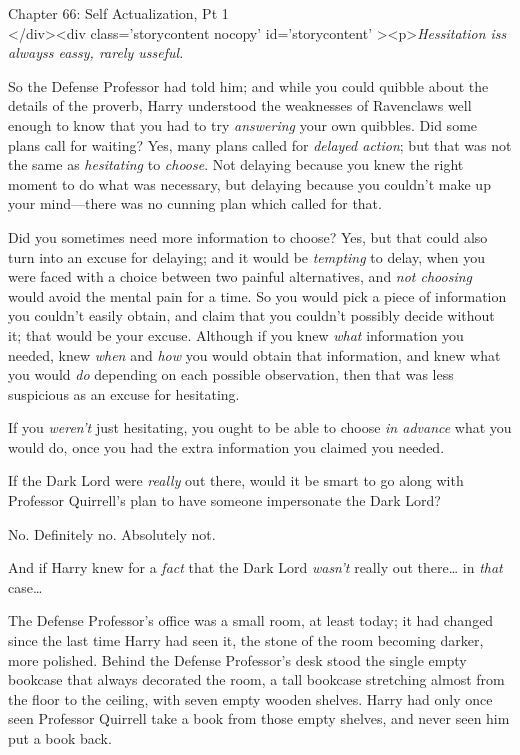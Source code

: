 
Chapter 66: Self Actualization, Pt 1\\
</div><div  class='storycontent nocopy' id='storycontent' ><p>\emph{Hessitation iss alwayss eassy, rarely usseful.}

So the Defense Professor had told him; and while you could quibble about the details of the proverb, Harry understood the weaknesses of Ravenclaws well enough to know that you had to try \emph{answering} your own quibbles. Did some plans call for waiting? Yes, many plans called for \emph{delayed action}; but that was not the same as \emph{hesitating} to \emph{choose}. Not delaying because you knew the right moment to do what was necessary, but delaying because you couldn't make up your mind---there was no cunning plan which called for that.

Did you sometimes need more information to choose? Yes, but that could also turn into an excuse for delaying; and it would be \emph{tempting} to delay, when you were faced with a choice between two painful alternatives, and \emph{not choosing} would avoid the mental pain for a time. So you would pick a piece of information you couldn't easily obtain, and claim that you couldn't possibly decide without it; that would be your excuse. Although if you knew \emph{what} information you needed, knew \emph{when} and \emph{how} you would obtain that information, and knew what you would \emph{do} depending on each possible observation, then that was less suspicious as an excuse for hesitating.

If you \emph{weren't} just hesitating, you ought to be able to choose \emph{in advance} what you would do, once you had the extra information you claimed you needed.

If the Dark Lord were \emph{really} out there, would it be smart to go along with Professor Quirrell's plan to have someone impersonate the Dark Lord?

No. Definitely no. Absolutely not.

And if Harry knew for a \emph{fact} that the Dark Lord \emph{wasn't} really out there{\ldots} in \emph{that} case{\ldots}

The Defense Professor's office was a small room, at least today; it had changed since the last time Harry had seen it, the stone of the room becoming darker, more polished. Behind the Defense Professor's desk stood the single empty bookcase that always decorated the room, a tall bookcase stretching almost from the floor to the ceiling, with seven empty wooden shelves. Harry had only once seen Professor Quirrell take a book from those empty shelves, and never seen him put a book back.

